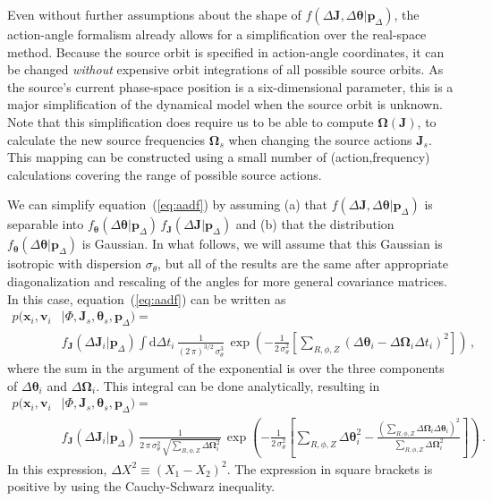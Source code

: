 \documentclass[12pt,preprint]{aastex}
\newcommand{\dd}{\mathrm{d}}
\newcommand{\eqnname}{equation}
\renewcommand{\vec}[1]{\ensuremath{\mathbf{#1}}}
\newcommand{\vecx}{\ensuremath{\vec{x}}}
\newcommand{\vecv}{\ensuremath{\vec{v}}}
\newcommand{\vecj}{\ensuremath{\vec{J}}}
\newcommand{\veco}{\ensuremath{\vec{\Omega}}}
\newcommand{\veca}{\ensuremath{\boldsymbol\theta}}
\newcommand{\paramsdiff}{\ensuremath{\vec{p}_\Delta}}
\begin{document}
Even without further assumptions about the shape of $f(\Delta
\vecj,\Delta \veca|\paramsdiff)$, the action-angle formalism already
allows for a simplification over the real-space method. Because the
source orbit is specified in action-angle coordinates, it can be
changed \emph{without} expensive orbit integrations of all possible
source orbits. As the source's current phase-space position is a
six-dimensional parameter, this is a major simplification of the
dynamical model when the source orbit is unknown. Note that this
simplification does require us to be able to compute $\veco(\vecj)$,
to calculate the new source frequencies $\veco_s$ when changing the
source actions $\vecj_s$. This mapping can be constructed using a
small number of (action,frequency) calculations covering the range of
possible source actions.

We can simplify \eqnname~(\ref{eq:aadf}) by assuming (a) that
$f(\Delta \vecj,\Delta \veca|\paramsdiff)$ is separable into
$f_{\veca}(\Delta \veca|\paramsdiff)\,f_{\vecj}(\Delta
\vecj|\paramsdiff)$ and (b) that the distribution $f_{\veca}(\Delta
\veca|\paramsdiff)$ is Gaussian. In what follows, we will assume that
this Gaussian is isotropic with dispersion $\sigma_\theta$, but all of
the results are the same after appropriate diagonalization and
rescaling of the angles for more general covariance matrices. In this
case, \eqnname~(\ref{eq:aadf}) can be written as
\begin{equation}
\begin{split}
  p(\vecx_i,\vecv_i & | \Phi,\vecj_s,\veca_s,\paramsdiff) 
   = \\
   & f_{\vecj}(\Delta \vecj_i|\paramsdiff) \int \dd \Delta t_i\,
  \frac{1}{(2\,\pi)^{3/2}\,\sigma_\theta^3}\,\exp\left(-\frac{1}{2\,\sigma_\theta^2}\left[\sum_{R,\phi,Z}\left(\Delta \veca_i-\Delta \veco_i\Delta t_i\right)^2\right]\right)\,,
\end{split}
\end{equation}
where the sum in the argument of the exponential is over the three
components of $\Delta \veca_i$ and $\Delta \veco_i$. This integral can
be done analytically, resulting in
\begin{equation}\label{eq:aadfsimple}
\begin{split}
  p(\vecx_i,\vecv_i & | \Phi,\vecj_s,\veca_s,\paramsdiff) 
   = \\
   & f_{\vecj}(\Delta \vecj_i|\paramsdiff) \,  \frac{1}{2\,\pi\,\sigma_\theta^2\,\sqrt{\sum_{R,\phi,Z}\Delta \veco_i^2}}\,\exp\left(-\frac{1}{2\,\sigma_\theta^2}\left[\sum_{R,\phi,Z}\Delta \veca^2_i-\frac{\left(\sum_{R,\phi,Z} \Delta \veco_i\Delta \veca_i\right)^2}{\sum_{R,\phi,Z}\Delta \veco_i^2}\right]\right)\,.
\end{split}
\end{equation}
In this expression, $\Delta X^2 \equiv (X_1-X_2)^2$. The expression in
square brackets is positive by using the Cauchy-Schwarz inequality.
\end{document}
